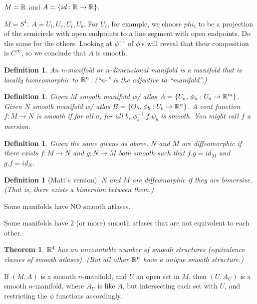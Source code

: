 \documentclass[11pt,leqno,oneside]{amsart}
\theoremstyle{mystyle} \newtheorem{thrm}[thm]{Theorem}
\theoremstyle{mystyle} \newtheorem{defi}[thm]{Definition}
\begin{document}
\begin{example}
	$M = {\mathbb R}$ and $A = \{ id: {\mathbb R} \to {\mathbb R} \}$.
\end{example}

\begin{example}
	$M = S^1$.  $A = {U_l, U_r, U_t, U_b}$.  For $U_t$, for example, we choose $phi_t$ to be a projection of the semicircle with open endpoints to a line segment with open endpoints.  Do the same for the others.  Looking at $\phi^{-1}$ of $\phi$'s will reveal that their composition is $C^\infty$, so we conclude that $A$ is smooth.
\end{example}

\begin{defi}
	An \emph{n-}manifold or \emph{n-dimensional} manifold is a manifold that is locally homeomorphic to ${\mathbb R}^n$.  (``n-'' is the adjective to ``manifold''.)
\end{defi}


\begin{defi}
	Given $M$ smooth manifold w/ atlas $A = \{ U_a, \,  \phi_a : U_a \to {\mathbb R}^m \}$.
	Given $N$ smooth manifold w/ atlas $B = \{ O_b, \,  \phi_b : U_b \to {\mathbb R}^n \}$.
	A cont function $f : M \to N$ is \emph{smooth} if for all $a$, for all $b$, $\phi_a^{-1}.f.\psi_b$ is smooth.  You might call $f$ a \emph{mersion}.
\end{defi}
\begin{defi}
	Given the same givens as above.
	$N$ and $M$ are \emph{diffeomorphic} if there exists $f : M \to N$ and $g : N \to M$ both smooth such that $f.g = id_M$ and $g.f = id_N$.
\end{defi}
\begin{defi}[Matt's version]
	$N$ and $M$ are \emph{diffeomorphic} if they are bimersive.  (That is, there exists a bimersion between them.)
\end{defi}

\begin{rmk}
	Some manifolds have NO smooth atlases.

	Some manifolds have 2 (or more) smooth atlases that are not equivalent to each other.
\end{rmk}


\begin{thrm}
	${\mathbb R}^4$ has an uncountable number of smooth structures (equivalence classes of smooth atlases).  (But all other ${\mathbb R}^n$ have a unique smooth structure.)
\end{thrm}

\begin{rmk}
	If $(M,A)$ is a smooth $n$-manifold, and $U$ an open set in $M$, then $(U,A_U)$ is a smooth $n$-manifold, where $A_U$ is like $A$, but intersecting each set with $U$, and restricting the $\phi$ functions accordingly.
\end{rmk}
\end{document}
